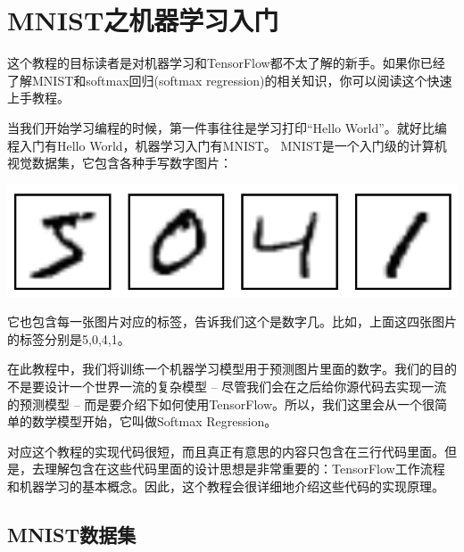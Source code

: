 


\newpage
\section {MNIST之机器学习入门}\label{MINIST_beginner}


这个教程的目标读者是对机器学习和TensorFlow都不太了解的新手。如果你已经了解MNIST和softmax回归(softmax regression)的相关知识，你可以阅读这个快速上手教程。


当我们开始学习编程的时候，第一件事往往是学习打印“Hello World”。就好比编程入门有Hello World，机器学习入门有MNIST。
MNIST是一个入门级的计算机视觉数据集，它包含各种手写数字图片：
\begin{center}
\includegraphics[width=.55\textwidth]{../SOURCE/images/MNIST.png}
\end{center}
它也包含每一张图片对应的标签，告诉我们这个是数字几。比如，上面这四张图片的标签分别是5,0,4,1。

在此教程中，我们将训练一个机器学习模型用于预测图片里面的数字。我们的目的不是要设计一个世界一流的复杂模型 -- 尽管我们会在之后给你源代码去实现一流的预测模型 -- 而是要介绍下如何使用TensorFlow。所以，我们这里会从一个很简单的数学模型开始，它叫做Softmax Regression。

对应这个教程的实现代码很短，而且真正有意思的内容只包含在三行代码里面。但是，去理解包含在这些代码里面的设计思想是非常重要的：TensorFlow工作流程和机器学习的基本概念。因此，这个教程会很详细地介绍这些代码的实现原理。

\subsection {MNIST数据集}

